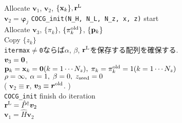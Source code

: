 \documentclass[12pt,titlepage]{jarticle}
\renewenvironment{leftbar}{%
  \def\FrameCommand{\vrule width 1pt \hspace{0pt}}%
  \MakeFramed {\advance\hsize-\width \FrameRestore}}%
 {\endMakeFramed}
\begin{document}
\noindent
Allocate ${\boldsymbol v}_1$, ${\boldsymbol v}_2$, $\{{\bf x}_k\}, {\bf r}^{\rm L}$
\\ 
${\boldsymbol v}_2 = {\boldsymbol \varphi_j}$
\vspace{-1em}
\begin{leftbar}
  \noindent
  \verb|COCG_init(N_H, N_L, N_z, x, z)| start
  \\ \hspace{0.5cm}
  Allocate ${\boldsymbol v}_3$, $\{\pi_k\}$, $\{\pi_k^{\rm old}\}$, $\{{\bf p}_k\}$
  \\ \hspace{0.5cm}
  Copy $\{z_k\}$
  \\ \hspace{0.5cm}
  \verb|itermax|$\neq$\verb|0|ならば$\alpha$, $\beta$, ${\bf r}^{\rm L}$を保存する配列を確保する.
  \\ \hspace{0.5cm}
  ${\boldsymbol v}_3 = {\bf 0}$,
  \\ \hspace{0.5cm}
  ${\bf p}_{k} = {\bf x}_k = {\bf 0}(k=1 \cdots N_z),\; \pi_k=\pi_k^{\rm old} = 1(k=1 \cdots N_z)$ 
  \\ \hspace{0.5cm}
  $\rho = \infty,\; \alpha = 1,\; \beta=0,\; z_{\rm seed}=0$ 
  \\ \hspace{0.5cm}
  (
  ${\boldsymbol v}_2 \equiv {\boldsymbol r}$, 
  ${\boldsymbol v}_3 \equiv {\boldsymbol r}^{\rm old}$. )
  \\
  \verb|COCG_init| finish
\end{leftbar}
\vspace{-1em}
\noindent
do iteration
\\\hspace{0.5cm}
${\bf r}^{\rm L} = {\hat P}^\dagger {\boldsymbol v}_2$
\\\hspace{0.5cm}
${\boldsymbol v}_1 = {\hat H} {\boldsymbol v}_2$
\vspace{-1em}
\end{document}
